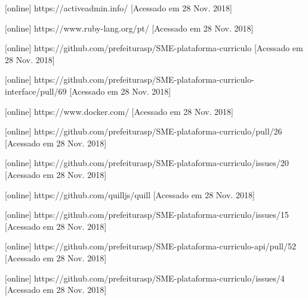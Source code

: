 \documentclass[a4paper, 11pt]{article} %
\begin{document}
\begin{thebibliography}{9}
[online] https://activeadmin.info/ [Acessado em 28 Nov. 2018]

[online] https://www.ruby-lang.org/pt/ [Acessado em 28 Nov. 2018]

[online] https://github.com/prefeiturasp/SME-plataforma-curriculo [Acessado em 28 Nov. 2018]

[online] https://github.com/prefeiturasp/SME-plataforma-curriculo-interface/pull/69 [Acessado em 28 Nov. 2018]

[online] https://www.docker.com/ [Acessado em 28 Nov. 2018]

[online] https://github.com/prefeiturasp/SME-plataforma-curriculo/pull/26 [Acessado em 28 Nov. 2018]

[online] https://github.com/prefeiturasp/SME-plataforma-curriculo/issues/20 [Acessado em 28 Nov. 2018]

[online] https://github.com/quilljs/quill [Acessado em 28 Nov. 2018]

[online] https://github.com/prefeiturasp/SME-plataforma-curriculo/issues/15 [Acessado em 28 Nov. 2018]

[online] https://github.com/prefeiturasp/SME-plataforma-curriculo-api/pull/52 [Acessado em 28 Nov. 2018]

[online] https://github.com/prefeiturasp/SME-plataforma-curriculo/issues/4 [Acessado em 28 Nov. 2018]

\end{thebibliography}
\end{document}
